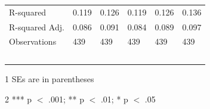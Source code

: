\documentclass[12pt]{article}
\begin{document}
\begin{table}[!ht]
\begin{tabular}{llllll}
        R-squared & 0.119 & 0.126 & 0.119 & 0.126 & 0.136 \\
        R-squared Adj. & 0.086 & 0.091 & 0.084 & 0.089 & 0.097 \\
        Observations  & 439 & 439 & 439 & 439 & 439 \\
        ~ & ~ & ~ & ~ & ~ & ~ \\
        \midrule
    \end{tabular}
    \begin{tablenotes}
      \item[1] SEs are in parentheses
      \item[2] *** p $<$ .001; ** p $<$ .01; * p $<$ .05
\end{tablenotes}
  \label{table6}
\end{table}

\clearpage
\end{document}
